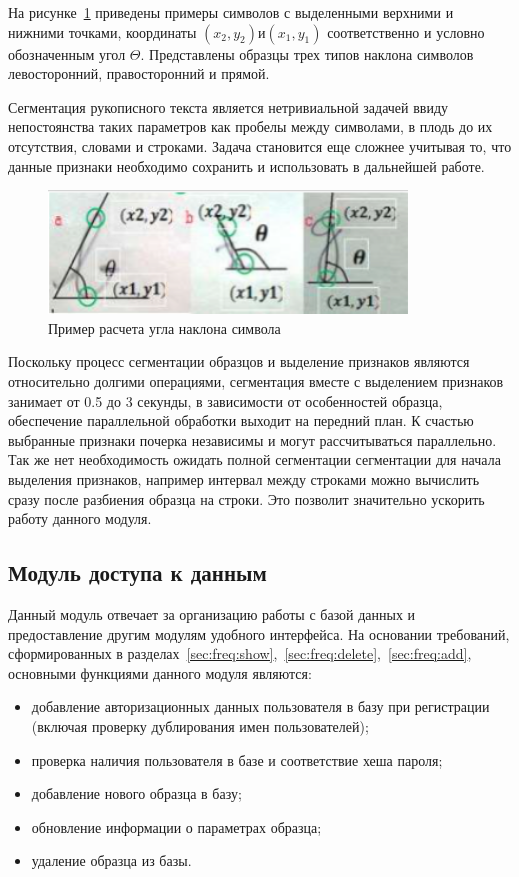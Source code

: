 На рисунке~\ref{fig:architecture:symbol_angle} приведены примеры символов с выделенными верхними и нижними точками, координаты $ (x_2, y_2) и (x_1, y_1) $ соответственно и условно обозначенным угол $ \Theta $. Представлены образцы трех типов наклона символов левосторонний, правосторонний и прямой.

Сегментация рукописного текста является нетривиальной задачей ввиду непостоянства таких параметров как пробелы между символами, в плодь до их отсутствия, словами и строками. Задача становится еще сложнее учитывая то, что данные признаки необходимо сохранить и использовать в дальнейшей работе.

\begin{figure}[ht]
    \centering
    \includegraphics[width=0.85\textwidth]{figures/char_angle.png}
    \caption{Пример расчета угла наклона символа}
    \label{fig:architecture:symbol_angle}
\end{figure}

Поскольку процесс сегментации образцов и выделение признаков являются относительно долгими операциями, сегментация вместе с выделением признаков занимает от 0.5 до 3 секунды, в зависимости от особенностей образца, обеспечение параллельной обработки выходит на передний план. К счастью выбранные признаки почерка независимы и могут рассчитываться параллельно. Так же нет необходимость ожидать полной сегментации сегментации для начала выделения признаков, например интервал между строками можно вычислить сразу после разбиения образца на строки. Это позволит значительно ускорить работу данного модуля.

\subsection{Модуль доступа к данным}
Данный модуль отвечает за организацию работы с базой данных и предоставление другим модулям удобного интерфейса.
На основании требований, сформированных в разделах~\ref{sec:freq:show},~\ref{sec:freq:delete},~\ref{sec:freq:add}, основными функциями данного модуля являются:
\begin{itemize}
  \item добавление авторизационных данных пользователя в базу при регистрации (включая проверку дублирования имен пользователей);
  \item проверка наличия пользователя в базе и соответствие хеша пароля;
  \item добавление нового образца в базу;
  \item обновление информации о параметрах образца;
  \item удаление образца из базы.
\end{itemize}

